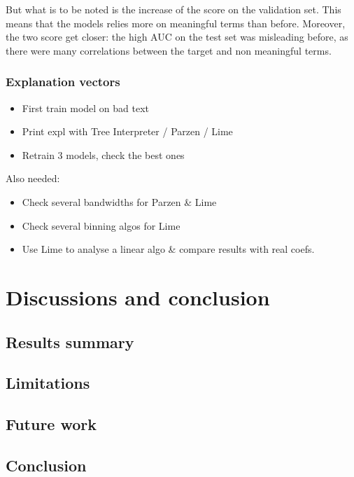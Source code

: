 \documentclass[a4paper,11pt]{kth-mag}
\begin{document}
But what is to be noted is the increase of the score on the validation set. This means that the models relies more on meaningful terms than before. Moreover, the two score get closer: the high AUC on the test set was misleading before, as there were many correlations between the target and non meaningful terms.


\subsection{Explanation vectors}

\vspace{5.0\baselineskip}

\begin{itemize}
	\item First train model on bad text
	\item Print expl with Tree Interpreter / Parzen / Lime
	\item Retrain 3 models, check the best ones
\end{itemize}


Also needed:

\begin{itemize}
	\item Check several bandwidths for Parzen \& Lime
	\item Check several binning algos for Lime
	\item Use Lime to analyse a linear algo \& compare results with real coefs.
\end{itemize}


\chapter{Discussions and conclusion}

\section{Results summary}

\section{Limitations}

\section{Future work}

\section{Conclusion}


\nocite{mythos}
\nocite{euregulation}
\nocite{healthcare}
\nocite{trust}
\nocite{explainingclassif}
\nocite{evolutionnary}
\nocite{breastcancer}
\nocite{sensitivity}

\printbibliography
\end{document}
